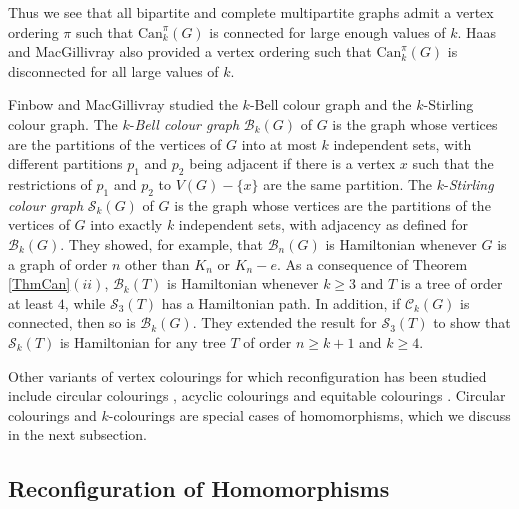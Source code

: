 \documentclass[12pt]{article}%
\begin{document}
Thus we see that all bipartite and complete multipartite graphs admit a vertex
ordering $\pi$ such that $\mathrm{Can}_{k}^{\pi}(G)$ is connected for large
enough values of $k$. Haas and MacGillivray also provided a vertex ordering
such that $\mathrm{Can}_{k}^{\pi}(G)$ is disconnected for all large values of
$k$.

Finbow and MacGillivray \cite{26CM-FM} studied the $k$-Bell colour graph and
the $k$-Stirling colour graph. The $k$-\emph{Bell colour graph} $\mathcal{B}%
_{k}(G)$ of $G$ is the graph whose vertices are the partitions of the vertices
of $G$ into at most $k$ independent sets, with different partitions $p_{1}$
and $p_{2}$ being adjacent if there is a vertex $x$ such that the restrictions
of $p_{1}$ and $p_{2}$ to $V(G)-\{x\}$ are the same partition. The
$k$-\emph{Stirling colour graph} $\mathcal{S}_{k}(G)$ of $G$ is the graph
whose vertices are the partitions of the vertices of $G$ into exactly $k$
independent sets, with adjacency as defined for $\mathcal{B}_{k}(G)$. They
showed, for example, that $\mathcal{B}_{n}(G)$ is Hamiltonian whenever $G$ is
a graph of order $n$ other than $K_{n}$ or $K_{n}-e$. As a consequence of
Theorem \ref{ThmCan}$(ii)$, $\mathcal{B}_{k}(T)$ is Hamiltonian whenever
$k\geq3$ and $T$ is a tree of order at least $4$, while $\mathcal{S}_{3}(T)$
has a Hamiltonian path. In addition, if $\mathcal{C}_{k}(G)$ is connected,
then so is $\mathcal{B}_{k}(G)$. They extended the result for $\mathcal{S}%
_{3}(T)$ to show that $\mathcal{S}_{k}(T)$ is Hamiltonian for any tree $T$ of
order $n\geq k+1$ and $k\geq4$.

Other variants of vertex colourings for which reconfiguration has been studied
include circular colourings \cite{26CM-BMMN, 26CM-BN}, acyclic colourings
\cite{26CM-Vai} and equitable colourings \cite{26CM-Vai}. Circular colourings
and $k$-colourings are special cases of homomorphisms, which we discuss in the
next subsection.

\subsection{Reconfiguration of Homomorphisms}
\end{document}
